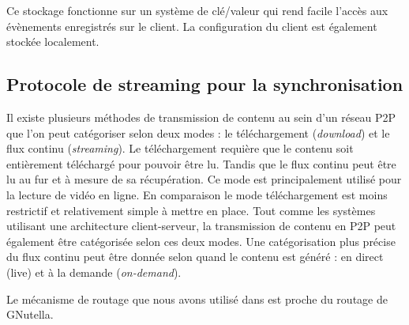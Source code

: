 Ce stockage fonctionne sur un système de clé/valeur qui rend facile l'accès aux 
évènements enregistrés sur le client. La configuration du client est également 
stockée localement. 

\subsection{Protocole de streaming pour la synchronisation}
\label{streamingprotocol}

Il existe plusieurs méthodes de transmission de contenu au sein d'un réseau P2P 
que l'on peut catégoriser selon deux modes : le téléchargement (\textit{download}) 
et le flux continu (\textit{streaming}). Le téléchargement requière que le contenu 
soit entièrement téléchargé pour pouvoir être lu. Tandis que le flux continu peut 
être lu au fur et à mesure de sa récupération. Ce mode est principalement utilisé 
pour la lecture de vidéo en ligne. En comparaison le mode téléchargement est 
moins restrictif et relativement simple à mettre en place. Tout comme les 
systèmes utilisant une architecture client-serveur, la transmission de contenu en 
P2P peut également être catégorisée selon ces deux modes. Une catégorisation 
plus précise du flux continu peut être donnée selon quand le contenu est généré : 
en direct (live) et à la demande (\textit{on-demand}).


Le mécanisme de routage que nous avons utilisé dans \cite{Desprat2015a} est 
proche du routage de GNutella. 


